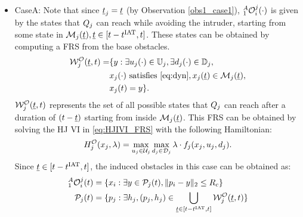 \begin{itemize}[leftmargin=*] 
\item \label{sec:intruderObs_case1_caseA} CaseA: Note that since $\underline{t}_j = \underline{t}$ (by Observation \ref{obs1_case1}), $_1^A\mathcal{O}_i^j(\cdot)$ is given by the states that $Q_j$ can reach while avoiding the intruder, starting from some state in $\mathcal{M}_j(\underline{t}), \underline{t} \in [t-t^\text{IAT}, t]$. These states can be obtained by computing a FRS from the base obstacles.
\begin{equation} \label{eq:ObsFRS_case2}
\begin{aligned}
\frs_{j}^{\mathcal{O}}(\tsa, t) = & \{y: \exists \ctrl_j(\cdot) \in \cfset_j, \exists \dstb_j(\cdot) \in \dfset_j, \\
& \state_j(\cdot) \text{ satisfies \eqref{eq:dyn}}, \state_j(\tsa) \in \boset_j(\tsa), \\
& \state_j(t) = y\}.
\end{aligned}
\end{equation}
$\mathcal{W}_{j}^{\mathcal{O}}(\underline{t}, t)$ represents the set of all possible states that $Q_j$ can reach after a duration of $(t-\underline{t})$ starting from inside $\mathcal{M}_j(\underline{t})$. This FRS can be obtained by solving the HJ VI in \eqref{eq:HJIVI_FRS} with the following Hamiltonian:
\begin{equation}
H_{j}^{\mathcal{O}}(x_j, \lambda) = \max_{u_j \in \mathcal{U}_j} \max_{d_j \in \mathcal{D}_j} \lambda \cdot f_j (x_j, u_j, d_j).
\end{equation} 
Since $\underline{t} \in [t-t^\text{IAT}, t]$, the induced obstacles in this case can be obtained as:
\begin{equation} \label{eq:intruderObs_case2} 
\begin{aligned}
_1^A\ioset_i^j(t) & = \{\state_i: \exists y \in \pfrs_j(t), \|\pos_i - y\|_2 \le \rc \}\\
\pfrs_j(t) & = \{p_j: \exists \npos_j, (p_j, \npos_j) \in \bigcup_{\tsa \in [t-\iat, t]} \frs_{j}^{\mathcal{O}}(\tsa, t) \}
\end{aligned}
\end{equation}


\end{itemize}
